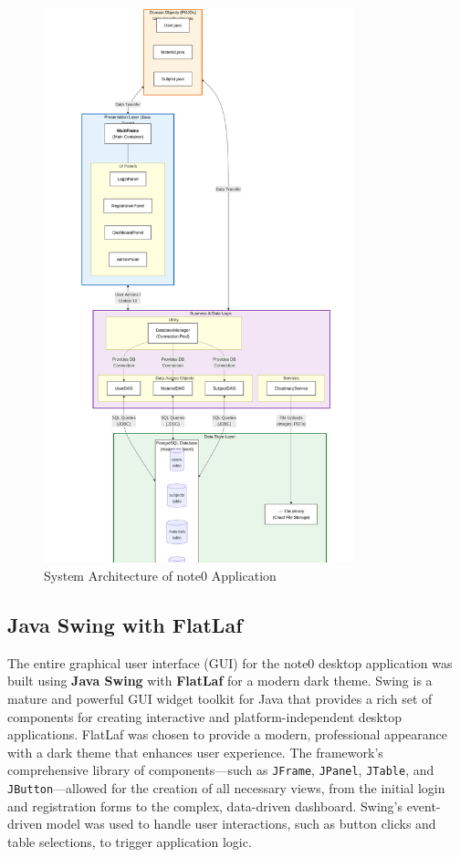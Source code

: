 \documentclass[12pt, a4paper]{report}
\begin{document}
\begin{figure}[h!]
    \centering
    \includegraphics[width=0.8\textwidth]{images/architecture.jpeg}
    \caption{System Architecture of note0 Application}
    \label{fig:architecture}
\end{figure}

\subsection{Java Swing with FlatLaf}
The entire graphical user interface (GUI) for the note0 desktop application was built using \textbf{Java Swing} with \textbf{FlatLaf} for a modern dark theme. Swing is a mature and powerful GUI widget toolkit for Java that provides a rich set of components for creating interactive and platform-independent desktop applications. FlatLaf was chosen to provide a modern, professional appearance with a dark theme that enhances user experience. The framework's comprehensive library of components—such as \texttt{JFrame}, \texttt{JPanel}, \texttt{JTable}, and \texttt{JButton}—allowed for the creation of all necessary views, from the initial login and registration forms to the complex, data-driven dashboard. Swing's event-driven model was used to handle user interactions, such as button clicks and table selections, to trigger application logic.
\end{document}
